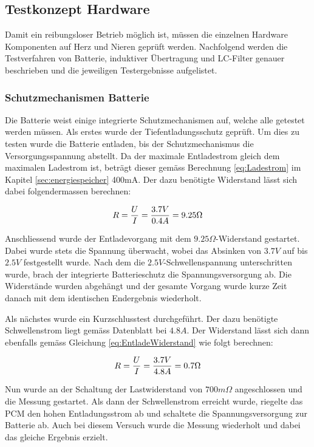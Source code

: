 \subsection{Testkonzept Hardware}\label{sec:testkonzeptHardware}
Damit ein reibungsloser Betrieb möglich ist, müssen die einzelnen Hardware Komponenten auf Herz und Nieren geprüft werden. Nachfolgend werden die Testverfahren von Batterie, induktiver Übertragung und LC-Filter genauer beschrieben und die jeweiligen Testergebnisse aufgelistet.

\subsubsection*{Schutzmechanismen Batterie}\label{sec:batterieSchutzVal}
Die Batterie weist einige integrierte Schutzmechanismen auf, welche alle getestet werden müssen. Als erstes wurde der Tiefentladungsschutz geprüft. Um dies zu testen wurde die Batterie entladen, bis der Schutzmechanismus die Versorgungsspannung abstellt. Da der maximale Entladestrom gleich dem maximalen Ladestrom ist, beträgt dieser gemäss Berechnung \ref{eq:Ladestrom} im Kapitel \ref{sec:energiespeicher} 400mA. Der dazu benötigte Widerstand lässt sich dabei folgendermassen berechnen:
 
\begin{equation}
\centering
R=\frac{U}{I}=\frac{3.7V}{0.4A}= 9.25\Omega
\label{eq:EntladeWiderstand}
\end{equation}

Anschliessend wurde der Entladevorgang mit dem $9.25\Omega$-Widerstand gestartet. Dabei wurde stets die Spannung überwacht, wobei das Absinken von $3.7V$ auf bis $2.5V$ festgestellt wurde. Nach dem die $2.5V$-Schwellenspannung unterschritten wurde, brach der integrierte Batterieschutz die Spannungsversorgung ab. Die Widerstände wurden abgehängt und der gesamte Vorgang wurde kurze Zeit danach mit dem identischen Endergebnis wiederholt.

Als nächstes wurde ein Kurzschlusstest durchgeführt. Der dazu benötigte Schwellenstrom liegt gemäss Datenblatt \cite{LIBattery} bei $4.8A$. Der Widerstand lässt sich dann ebenfalls gemäss Gleichung \ref{eq:EntladeWiderstand} wie folgt berechnen:

\begin{equation}
\centering
R=\frac{U}{I}=\frac{3.7V}{4.8A}= 0.7\Omega
\label{eq:EntladeWiderstand1}
\end{equation}

Nun wurde an der Schaltung der Lastwiderstand von $700m\Omega$ angeschlossen und die Messung gestartet. Als dann der Schwellenstrom erreicht wurde, riegelte das PCM den hohen Entladungsstrom ab und schaltete die Spannungsversorgung zur Batterie ab. Auch bei diesem Versuch wurde die Messung wiederholt und dabei das gleiche Ergebnis erzielt.

